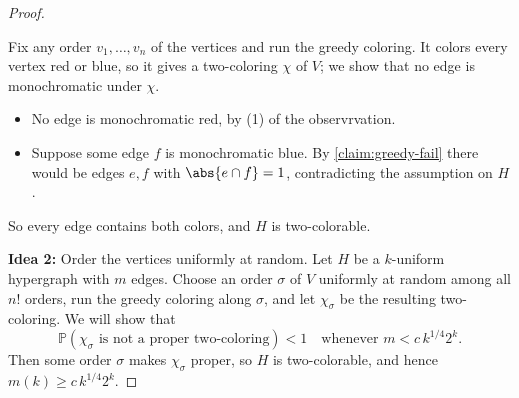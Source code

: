 \begin{proof}
    \begin{subproof}
        Fix any order \(v_1, \ldots, v_n\) of the vertices and run the greedy coloring. It colors every vertex red or blue, so it gives a two-coloring \(\chi\) of \(V\); we show that no edge is monochromatic under \(\chi\).
        \begin{itemize}
            \item No edge is monochromatic red, by (1) of the observrvation.
            \item Suppose some edge \(f\) is monochromatic blue. By \autoref{claim:greedy-fail} there would be edges \(e, f\) with \(\abs{e \cap f} = 1\), contradicting the assumption on \(H\).
        \end{itemize}
        So every edge contains both colors, and \(H\) is two-colorable.
    \end{subproof}

    \textbf{Idea 2:} Order the vertices uniformly at random. Let \(H\) be a \(k\)-uniform hypergraph with \(m\) edges. Choose an order \(\sigma\) of \(V\) uniformly at random among all \(n!\) orders, run the greedy coloring along \(\sigma\), and let \(\chi_\sigma\) be the resulting two-coloring. We will show that
    \[
        \mathbb{P}(\chi_\sigma \text{ is not a proper two-coloring}) < 1 \quad \text{whenever } m < c \, k^{1/4} 2^k.
    \]
    Then some order \(\sigma\) makes \(\chi_\sigma\) proper, so \(H\) is two-colorable, and hence \(m(k) \ge c \, k^{1/4} 2^k\).


\end{proof}
